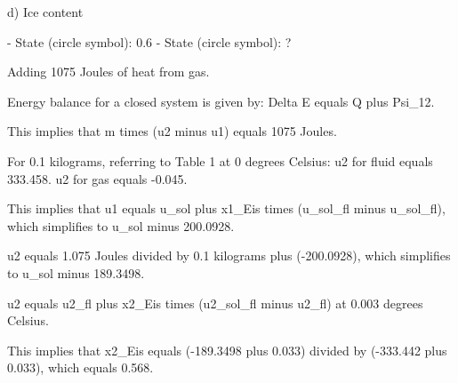 d) Ice content

- State (circle symbol): 0.6
- State (circle symbol): ?

Adding 1075 Joules of heat from gas.

Energy balance for a closed system is given by:
Delta E equals Q plus Psi_12.

This implies that m times (u2 minus u1) equals 1075 Joules.

For 0.1 kilograms, referring to Table 1 at 0 degrees Celsius:
u2 for fluid equals 333.458.
u2 for gas equals -0.045.

This implies that u1 equals u_sol plus x1_Eis times (u_sol_fl minus u_sol_fl),
which simplifies to u_sol minus 200.0928.

u2 equals 1.075 Joules divided by 0.1 kilograms plus (-200.0928),
which simplifies to u_sol minus 189.3498.

u2 equals u2_fl plus x2_Eis times (u2_sol_fl minus u2_fl) at 0.003 degrees Celsius.

This implies that x2_Eis equals (-189.3498 plus 0.033) divided by (-333.442 plus 0.033), which equals 0.568.